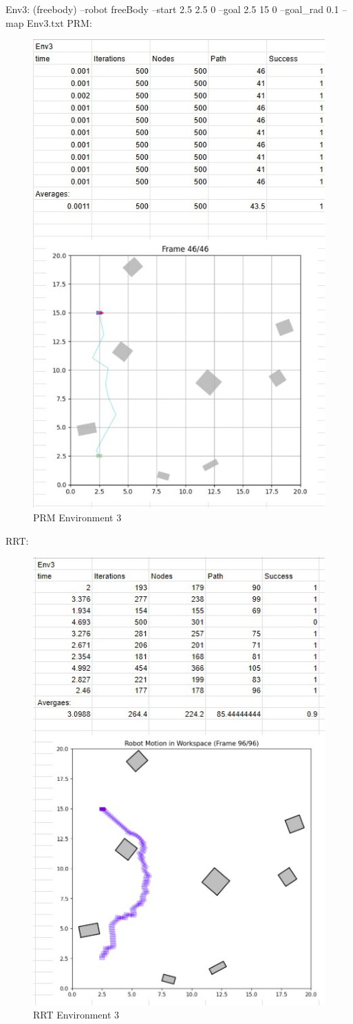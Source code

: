 \documentclass{article}
\begin{document}
Env3: (freebody) \newline
--robot freeBody --start 2.5 2.5  0 --goal 2.5 15 0 --goal\_rad 0.1 --map Env3.txt \newline
    PRM:
    \begin{figure} [H]
        \centering
        \includegraphics[width=0.5\linewidth]{latex_media/PRMEnv3Stats.jpg}
        \caption{PRM Environment 3}
    \end{figure}
    RRT: 
    \begin{figure} [H]
        \centering
        \includegraphics[width=0.5\linewidth]{latex_media/RRTEnv3Stats.jpg}
        \caption{RRT Environment 3}
    \end{figure}
    
\end{document}
